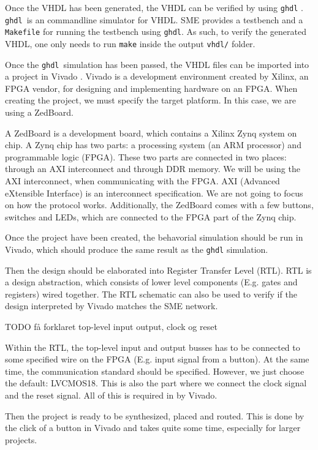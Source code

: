 Once the VHDL has been generated, the VHDL can be verified by using
\texttt{ghdl} \cite{ref:ghdl}. \texttt{ghdl} is an commandline simulator for VHDL. SME provides
a testbench and a \texttt{Makefile} for running the testbench using
\texttt{ghdl}. As such, to verify the generated VHDL, one only needs to run
\texttt{make} inside the output \texttt{vhdl/} folder.

Once the \texttt{ghdl} simulation has been passed, the VHDL files can be
imported into a project in Vivado \cite{ref:vivado}. Vivado is a development environment created by
Xilinx, an FPGA vendor, for designing and implementing hardware on an FPGA.
When creating the project, we must specify the target platform. In this case,
we are using a ZedBoard.

A ZedBoard is a development board, which contains a Xilinx Zynq system on chip.
A Zynq chip has two parts: a processing system (an ARM processor) and
programmable logic (FPGA). These two parts are connected in two places: through an AXI interconnect and through DDR memory.
We will be using the AXI interconnect, when communicating with the FPGA.
AXI (Advanced eXtensible Interface) is an interconnect specification. We are not
going to focus on how the protocol works. Additionally,
the ZedBoard comes with a few buttons, switches and LEDs, which are connected to the FPGA part of the Zynq chip.

Once the project
have been created, the behavorial simulation should be run in Vivado, which
should produce the same result as the \texttt{ghdl} simulation.

Then the design should be elaborated into Register Transfer Level (RTL). RTL is
a design abstraction, which consists of lower level components (E.g. gates and
registers) wired together. The RTL schematic can also be used to verify if the
design interpreted by Vivado matches the SME network.

TODO få forklaret top-level input output, clock og reset

Within the RTL, the top-level input and output busses has to be connected to
some specified wire on the FPGA (E.g. input signal from a button). At the same
time, the communication standard should be specified. However, we just choose
the default: LVCMOS18. This is also the part where we connect the clock signal
and the reset signal. All of this is required in by Vivado.

Then the project is ready to be synthesized, placed and routed. This is done by
the click of a button in Vivado and takes quite some time, especially for
larger projects.

